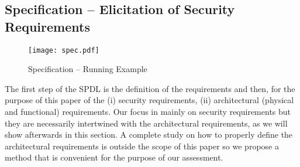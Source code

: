 \subsection{Specification -- Elicitation of Security Requirements}\label{sec:properties}
\begin{figure}[t]
	\centering
	\texttt{[image: spec.pdf]}
	\caption{Specification -- Running Example}
	\label{fig:spec}
\end{figure}
The first step of the SPDL is the definition of the requirements and then, for
the purpose of this paper of the (i) security requirements, (ii) architectural
(physical and functional) requirements.  Our focus in mainly on security
requirements but they are necessarily intertwined with the architectural
requirements, as we will show afterwards in this section.  A complete study on
how to properly define the architectural requirements is outside the scope of
this paper so we propose a method that is convenient for the purpose of our
assessment.

